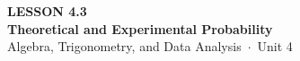 \documentclass[aspectratio=169, 11pt]{beamer}
\begin{document}
{
\begin{frame}[plain]
  \vspace{2.8cm}\hspace{0.55cm}%
  \begin{minipage}{0.9\textwidth}
    {\color{goldacc}\bfseries\small LESSON 4.3}\\[0.5cm]
    {\color{white}\bfseries\LARGE Theoretical and Experimental Probability}\\[1.2cm]
    {\color{mistmid}\small Algebra, Trigonometry, and Data Analysis~$\cdot$~Unit 4}
  \end{minipage}
\end{frame}
}

\begin{frame}[t, plain]
\end{frame}
\end{document}
